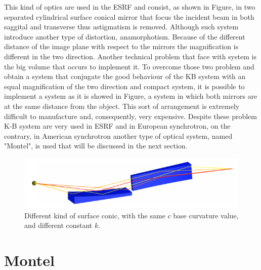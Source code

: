 \hspace{10mm} This kind of optics are used in the ESRF and consist, as shown in Figure, in two separated cylindrical surface conical mirror that focus the incident beam in both saggital and transverse thus astigmatism is removed. Although such system introduce another type of distortion, anamorphotism. Because of the different distance of the image plane with respect to the mirrors the magnification is different in the two direction.  Another technical problem that face with system is the big volume that occurs to implement it.
\noindent To overcome those two problem and obtain a system that conjugate the good behaviour of the KB system with an equal magnification of the two direction and compact system, it is possible to implement a system as it is showed in Figure, a system in which both mirrors are at the same distance from the object. This sort of arrangement is extremely difficult to manufacture and, consequently, very expensive.
\noindent Despite these problem K-B system are very used in ESRF and in European synchrotron, on the contrary, in American synchrotron another type of optical system, named "Montel", is used that will be discussed in the next section.
\begin{figure}[H]
%
\centering
%
\includegraphics[width=.6\textwidth]{Immagini/Chapter2/KBSystem}
%
\caption{Different kind of surface conic, with the same $c $ base curvature value, and different constant $k $.}
%
\label{fig: SurfaceConic1}
%
\end{figure}


\section{Montel}

